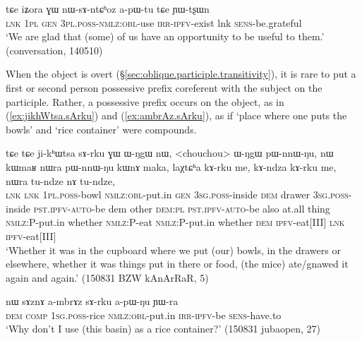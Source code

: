  \begin{exe}
\ex \label{ex:nWsAntChoz}
\gll  tɕe iʑora ɣɯ nɯ-sɤ-ntɕʰoz a-pɯ-tu tɕe ɲɯ-tʂɯn \\
\textsc{lnk} \textsc{1pl} \textsc{gen} \textsc{3pl}.\textsc{poss}-\textsc{nmlz}:\textsc{obl}-use \textsc{irr}-\textsc{ipfv}-exist lnk \textsc{sens}-be.grateful \\
\glt `We are glad that (some) of us have an opportunity to be useful to them.' (conversation, 140510)
 \end{exe}
   
When the object is overt (§\ref{sec:oblique.participle.transitivity}), it is rare to put a first or second person possessive prefix coreferent with the subject on the participle. Rather, a possessive prefix occurs on the object, as in (\ref{ex:jikhWtsa.sArku}) and (\ref{ex:ambrAz.sArku}), as if  `place where one puts the bowls' and  `rice container' were compounds.

\begin{exe}
\ex \label{ex:jikhWtsa.sArku}
\gll    tɕe tɕe ji-kʰɯtsa sɤ-rku ɣɯ ɯ-ŋgɯ nɯ, <chouchou> ɯ-ŋgɯ pɯ-nnɯ-ŋu, nɯ kɯmaʁ nɯra pɯ-nnɯ-ŋu kɯnɤ maka, laχtɕʰa kɤ-rku me, kɤ-ndza kɤ-rku me, nɯra tu-ndze nɤ tu-ndze, \\
\textsc{lnk} \textsc{lnk} \textsc{1pl}.\textsc{poss}-bowl \textsc{nmlz}:\textsc{obl}-put.in \textsc{gen} \textsc{3sg}.\textsc{poss}-inside \textsc{dem} drawer \textsc{3sg}.\textsc{poss}-inside \textsc{pst}.\textsc{ipfv}-\textsc{auto}-be dem other \textsc{dem}:\textsc{pl} \textsc{pst}.\textsc{ipfv}-\textsc{auto}-be  also at.all thing \textsc{nmlz}:P-put.in whether \textsc{nmlz}:P-eat \textsc{nmlz}:P-put.in whether \textsc{dem} \textsc{ipfv}-eat[III] \textsc{lnk}  \textsc{ipfv}-eat[III] \\
\glt `Whether it was in the cupboard where we put (our) bowls, in the drawers or elsewhere, whether it was things put in there or food, (the mice) ate/gnawed it again and again.' (150831 BZW kAnArRaR, 5)
\end{exe} 

\begin{exe}
\ex \label{ex:ambrAz.sArku}
\gll  nɯ sɤznɤ a-mbrɤz sɤ-rku a-pɯ-ŋu ɲɯ-ra \\
\textsc{dem} \textsc{comp} \textsc{1sg}.\textsc{poss}-rice \textsc{nmlz}:\textsc{obl}-put.in \textsc{irr}-\textsc{ipfv}-be \textsc{sens}-have.to \\
\glt  `Why don't I use (this basin) as a rice container?' (150831 jubaopen, 27)
\end{exe} 

